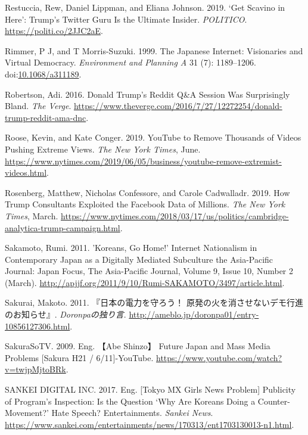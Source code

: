 \documentclass[10pt,british,A4paper,,openany]{memoir}
\begin{document}
\hypertarget{ref-restuccia_get_2019}{}
Restuccia, Rew, Daniel Lippman, and Eliana Johnson. 2019. `Get Scavino
in Here': Trump's Twitter Guru Is the Ultimate Insider. \emph{POLITICO}.
\url{https://politi.co/2JJC2aE}.

\hypertarget{ref-rimmer_japanese_1999}{}
Rimmer, P J, and T Morris-Suzuki. 1999. The Japanese Internet:
Visionaries and Virtual Democracy. \emph{Environment and Planning A} 31
(7): 1189--1206.
doi:\href{https://doi.org/10.1068/a311189}{10.1068/a311189}.

\hypertarget{ref-robertson_donald_2016}{}
Robertson, Adi. 2016. Donald Trump's Reddit Q\&A Session Was
Surprisingly Bland. \emph{The Verge}.
\url{https://www.theverge.com/2016/7/27/12272254/donald-trump-reddit-ama-dnc}.

\hypertarget{ref-roose_youtube_2019}{}
Roose, Kevin, and Kate Conger. 2019. YouTube to Remove Thousands of
Videos Pushing Extreme Views. \emph{The New York Times}, June.
\url{https://www.nytimes.com/2019/06/05/business/youtube-remove-extremist-videos.html}.

\hypertarget{ref-rosenberg_how_2019}{}
Rosenberg, Matthew, Nicholas Confessore, and Carole Cadwalladr. 2019.
How Trump Consultants Exploited the Facebook Data of Millions. \emph{The
New York Times}, March.
\url{https://www.nytimes.com/2018/03/17/us/politics/cambridge-analytica-trump-campaign.html}.

\hypertarget{ref-sakamoto_koreans_2011}{}
Sakamoto, Rumi. 2011. 'Koreans, Go Home!' Internet Nationalism in
Contemporary Japan as a Digitally Mediated Subculture the Asia-Pacific
Journal: Japan Focus, The Asia-Pacific Journal, Volume 9, Issue 10,
Number 2 (March).
\url{http://apjjf.org/2011/9/10/Rumi-SAKAMOTO/3497/article.html}.

\hypertarget{ref-sakurai__2011}{}
Sakurai, Makoto. 2011. 『日本の電力を守ろう！
原発の火を消させないデモ行進のお知らせ』. \emph{Doronpaの独り言}.
\url{http://ameblo.jp/doronpa01/entry-10856127306.html}.

\hypertarget{ref-sakurasotv_eng._2009}{}
SakuraSoTV. 2009. Eng. 【Abe Shinzo】 Future Japan and Mass Media
Problems {[}Sakura H21 / 6/11{]}-YouTube.
\url{https://www.youtube.com/watch?v=twjpMjtoBRk}.

\hypertarget{ref-sankei_digital_inc_eng._2017}{}
SANKEI DIGITAL INC. 2017. Eng. {[}Tokyo MX Girls News Problem{]}
Publicity of Program's Inspection: Is the Question `Why Are Koreans
Doing a Counter-Movement?' Hate Speech? Entertainments. \emph{Sankei
News}.
\url{https://www.sankei.com/entertainments/news/170313/ent1703130013-n1.html}.
\end{document}
